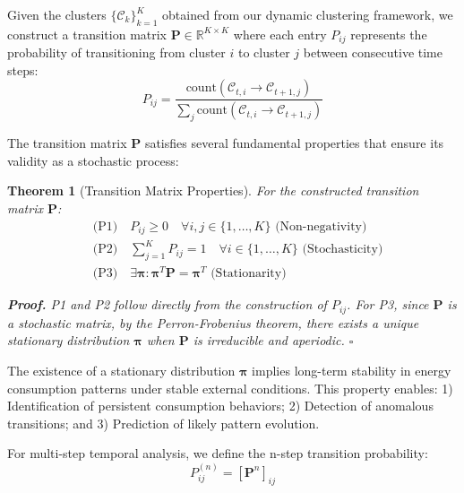 \documentclass[final,5p,times,twocolumn,numbers]{elsarticle}
\newtheorem{theorem}[definition]{Theorem}
\newenvironment{proof}[1][Proof]{\textbf{#1.} }{\hfill$\square$\par\vspace{1ex}}
\begin{document}
Given the clusters $\{\mathcal{C}_k\}_{k=1}^K$ obtained from our dynamic clustering framework, we construct a transition matrix $\mathbf{P} \in \mathbb{R}^{K \times K}$ where each entry $P_{ij}$ represents the probability of transitioning from cluster $i$ to cluster $j$ between consecutive time steps:
\begin{equation}
    P_{ij} = \frac{\text{count}(\mathcal{C}_{t,i} \to \mathcal{C}_{t+1,j})}{\sum_{j} \text{count}(\mathcal{C}_{t,i} \to \mathcal{C}_{t+1,j})}
\end{equation}

The transition matrix $\mathbf{P}$ satisfies several fundamental properties that ensure its validity as a stochastic process:
\begin{theorem}[Transition Matrix Properties]
For the constructed transition matrix $\mathbf{P}$:
\begin{equation}
    \begin{aligned}
    & \text{(P1)} \quad P_{ij} \geq 0 \quad \forall i,j \in \{1,\ldots,K\} \text{ (Non-negativity)} \\
    & \text{(P2)} \quad \sum_{j=1}^K P_{ij} = 1 \quad \forall i \in \{1,\ldots,K\} \text{ (Stochasticity)} \\
    & \text{(P3)} \quad \exists \boldsymbol{\pi}: \boldsymbol{\pi}^T\mathbf{P} = \boldsymbol{\pi}^T \text{ (Stationarity)}
    \end{aligned}
\end{equation}

\begin{proof}
P1 and P2 follow directly from the construction of $P_{ij}$. For P3, since $\mathbf{P}$ is a stochastic matrix, by the Perron-Frobenius theorem, there exists a unique stationary distribution $\boldsymbol{\pi}$ when $\mathbf{P}$ is irreducible and aperiodic.
\end{proof}
\end{theorem}

The existence of a stationary distribution $\boldsymbol{\pi}$ implies long-term stability in energy consumption patterns under stable external conditions. This property enables: 1) Identification of persistent consumption behaviors; 2) Detection of anomalous transitions; and 3) Prediction of likely pattern evolution.

For multi-step temporal analysis, we define the n-step transition probability:
\begin{equation}
    P_{ij}^{(n)} = [\mathbf{P}^n]_{ij}
\end{equation}
\end{document}
